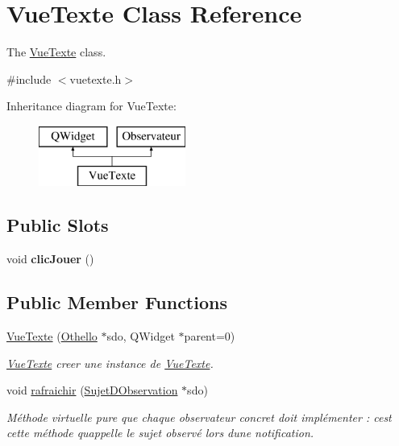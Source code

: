 \hypertarget{class_vue_texte}{}\section{Vue\+Texte Class Reference}
\label{class_vue_texte}


The \hyperlink{class_vue_texte}{Vue\+Texte} class.  




{\ttfamily \#include $<$vuetexte.\+h$>$}

Inheritance diagram for Vue\+Texte\+:\begin{figure}[H]
\begin{center}
\leavevmode
\includegraphics[height=2.000000cm]{class_vue_texte}
\end{center}
\end{figure}
\subsection*{Public Slots}
\begin{DoxyCompactItemize}
\item 
\hypertarget{class_vue_texte_a8535a7a50f221fd39db7b879b03517e4}{}void {\bfseries clic\+Jouer} ()\label{class_vue_texte_a8535a7a50f221fd39db7b879b03517e4}

\end{DoxyCompactItemize}
\subsection*{Public Member Functions}
\begin{DoxyCompactItemize}
\item 
\hyperlink{class_vue_texte_a168282221539be1ff2a735ea482eea82}{Vue\+Texte} (\hyperlink{class_othello}{Othello} $\ast$sdo, Q\+Widget $\ast$parent=0)
\begin{DoxyCompactList}\small\item\em \hyperlink{class_vue_texte}{Vue\+Texte} creer une instance de \hyperlink{class_vue_texte}{Vue\+Texte}. \end{DoxyCompactList}\item 
void \hyperlink{class_vue_texte_a5922b46ef0801278f9817358e521298d}{rafraichir} (\hyperlink{class_sujet_d_observation}{Sujet\+D\+Observation} $\ast$sdo)
\begin{DoxyCompactList}\small\item\em Méthode virtuelle pure que chaque observateur concret doit implémenter \+: c\textquotesingle{}est cette méthode qu\textquotesingle{}appelle le sujet observé lors d\textquotesingle{}une notification. \end{DoxyCompactList}\end{DoxyCompactItemize}


